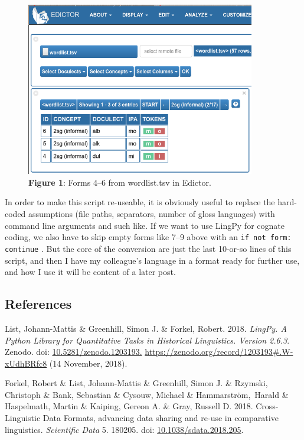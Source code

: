 \documentclass[
  a4paper,
  14pt,
  oneside,
  tablecaptionabove
]{scrbook}
\begin{document}
\begin{figure}[htb]
\centering
\includegraphics[width=10cm]{images/alorese.png}
\caption*{\small \textbf{Figure 1}: Forms 4--6 from wordlist.tsv in Edictor.}
\end{figure}

In order to make this script re-useable, it is obviously useful to
replace the hard-coded assumptions (file paths, separators, number of
gloss languages) with command line arguments and such like. If we want
to use LingPy for cognate coding, we also have to skip empty forms like
7--9 above with an \lstinline!if not form: continue! . But the core of
the conversion are just the last 10-or-so lines of this script, and then
I have my colleague's language in a format ready for further use, and
how I use it will be content of a later post.


\subsection*{References}

\nopagebreak\hangindent=0.7cm {\small List, Johann-Mattis \& Greenhill, Simon J. \& Forkel, Robert. 2018.
\emph{LingPy. A Python Library for Quantitative Tasks in Historical
Linguistics. Version 2.6.3}.  Zenodo. doi:
\href{https://doi.org/10.5281/zenodo.1203193.}{10.5281/zenodo.1203193.}
\url{https://zenodo.org/record/1203193\#.W-xUdhBRfc8} (14 November,
2018). }

\nopagebreak\hangindent=0.7cm {\small Forkel, Robert \& List, Johann-Mattis \& Greenhill, Simon J. \&
Rzymski, Christoph \& Bank, Sebastian \& Cysouw, Michael \&
Hammarström,~Harald \& Haspelmath, Martin \& Kaiping, Gereon A. \& Gray,
Russell D. 2018. Cross-Linguistic Data Formats, advancing data sharing
and re-use in comparative linguistics. \emph{Scientific Data} 5. 180205.
doi:
\href{https://doi.org/10.1038/sdata.2018.205}{10.1038/sdata.2018.205}. 
}
\end{document}
